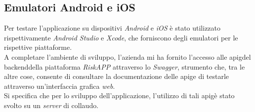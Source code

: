 \subsection*{Emulatori Android e iOS}
\label{subsec:emulatori}

Per testare l'applicazione su dispositivi \emph{Android} e \emph{iOS} è stato utilizzato rispettivamente \emph{Android Studio}\cite{site:android-studio} e \emph{Xcode}\cite{site:xcode}, che forniscono degli emulatori per le rispettive piattaforme.\\

A completare l'ambiente di sviluppo, l'azienda mi ha fornito l'accesso alle \gls{apig}\glsoccur del \gls{backend}\glsoccur della piattaforma \emph{RiskAPP} attraverso lo \emph{Swagger}\cite{site:swagger}, strumento che, tra le altre cose, consente di consultare la documentazione delle \gls{apig}\glsoccur e di testarle attraverso un'interfaccia grafica \emph{web}.\\
Si specifica che per lo sviluppo dell'applicazione, l'utilizzo di tali \gls{apig}\glsoccur è stato svolto su un \emph{server} di collaudo.